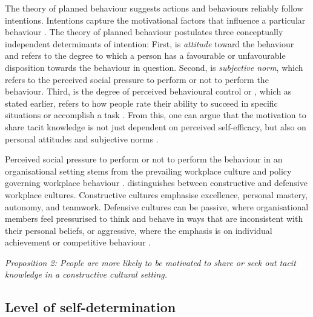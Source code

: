The theory of planned behaviour suggests actions and behaviours reliably follow intentions. Intentions capture the motivational factors that influence a particular behaviour \citep{ajzen1985intentions}. The theory of planned behaviour postulates three conceptually independent determinants of intention: First, is \emph{attitude} toward the behaviour and refers to the degree to which a person has a favourable or unfavourable disposition towards the behaviour in question. Second, is \emph{subjective norm}, which refers to the perceived social pressure to perform or not to perform the behaviour. Third, is the degree of perceived behavioural control or , which as stated earlier, refers to how people rate their ability to succeed in specific situations or accomplish a task \citep{bandura1977self,bandura1982self,ajzen1991theory}. From this, one can argue that the motivation to share tacit knowledge is not just dependent on perceived self-efficacy, but also on personal attitudes and subjective norms \citep{gagne2009model,chen2012behavioral}. \medskip

Perceived social pressure to perform or not to perform the behaviour in an organisational setting stems from the prevailing workplace culture and policy governing workplace behaviour \citep{papadopoulos2013exploring}. \citet{cooke1988behavioral} distinguishes between constructive and defensive workplace cultures. Constructive cultures emphasise excellence, personal mastery, autonomy, and teamwork. Defensive cultures can be passive, where organisational members feel pressurised to think and behave in ways that are inconsistent with their personal beliefs, or aggressive, where the emphasis is on individual achievement or competitive behaviour \citep{cooke1988behavioral}.  \medskip

\emph{Proposition 2: People are more likely to be motivated to share or seek out tacit knowledge in a constructive cultural setting.}

\subsection{Level of self-determination}

